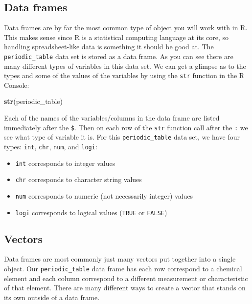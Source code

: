 \documentclass[]{tufte-book}
\newenvironment{Shaded}{\begin{snugshade}}{\end{snugshade}}
\newcommand{\KeywordTok}[1]{\textcolor[rgb]{0.13,0.29,0.53}{\textbf{{#1}}}}
\newcommand{\NormalTok}[1]{{#1}}
\providecommand{\tightlist}{%
  \setlength{\itemsep}{0pt}\setlength{\parskip}{0pt}}
\theoremstyle{definition}
\theoremstyle{definition}
\theoremstyle{remark}
\begin{document}
\subsection{Data frames}\label{data-frames}

Data frames are by far the most common type of object you will work with
in R. This makes sense since R is a statistical computing language at
its core, so handling spreadsheet-like data is something it should be
good at. The \texttt{periodic\_table} data set is stored as a data
frame. As you can see there are many different types of variables in
this data set. We can get a glimpse as to the types and some of the
values of the variables by using the \texttt{str} function in the R
Console:

\begin{Shaded}
\begin{Highlighting}[]
\KeywordTok{str}\NormalTok{(periodic_table)}
\end{Highlighting}
\end{Shaded}

Each of the names of the variables/columns in the data frame are listed
immediately after the \texttt{\$}. Then on each row of the \texttt{str}
function call after the \texttt{:} we see what type of variable it is.
For this \texttt{periodic\_table} data set, we have four types:
\texttt{int}, \texttt{chr}, \texttt{num}, and \texttt{logi}:

\begin{itemize}
\tightlist
\item
  \texttt{int} corresponds to integer values
\item
  \texttt{chr} corresponds to character string values
\item
  \texttt{num} corresponds to numeric (not necessarily integer) values
\item
  \texttt{logi} corresponds to logical values (\texttt{TRUE} or
  \texttt{FALSE})
\end{itemize}

\subsection{Vectors}\label{vectors}

Data frames are most commonly just many vectors put together into a
single object. Our \texttt{periodic\_table} data frame has each row
correspond to a chemical element and each column correspond to a
different measurement or characteristic of that element. There are many
different ways to create a vector that stands on its own outside of a
data frame. \newline\vspace*{0.1in}
\end{document}
